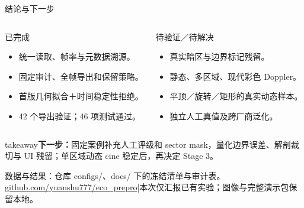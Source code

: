 \documentclass[aspectratio=169,10pt]{beamer}
\newcommand{\source}[1]{\par\vfill{\fontsize{6.1}{8}\selectfont\color{Muted}#1\par}}
\newcommand{\takeaway}[1]{\vspace{5pt}\begin{beamercolorbox}[wd=\linewidth,sep=6pt]{takeaway}\small #1\end{beamercolorbox}}
\begin{document}
\begin{frame}[t]{结论与下一步}
  \begin{columns}[T,onlytextwidth]
    \begin{block}{已完成}\small
      \begin{itemize}\setlength{\itemsep}{5pt}
        \item 统一读取、帧率与元数据溯源。
        \item 固定审计、全帧导出和保留策略。
        \item 首版几何拟合＋时间稳定性拒绝。
        \item 42 个导出验证；46 项测试通过。
      \end{itemize}
    \end{block}
    \begin{block}{待验证／待解决}\small
      \begin{itemize}\setlength{\itemsep}{5pt}
        \item 真实暗区与边界标记残留。
        \item 静态、多区域、现代彩色 Doppler。
        \item 平顶／旋转／矩形的真实动态样本。
        \item 独立人工真值及跨厂商泛化。
      \end{itemize}
    \end{block}
  \end{columns}
  \vspace{5pt}
  \takeaway{\textbf{下一步：}固定案例补充人工评级和 sector mask，量化边界误差、解剖裁切与 UI 残留；单区域动态 cine 稳定后，再决定 Stage 3。}
  \source{数据与结果：仓库 configs/、docs/ 下的冻结清单与审计表。\\
    \href{https://github.com/yuanshu777/eco_prepro}{github.com/yuanshu777/eco\_prepro}\quad |\quad 本次仅汇报已有实验；图像与完整演示包保留本地。}
\end{frame}
\end{document}
